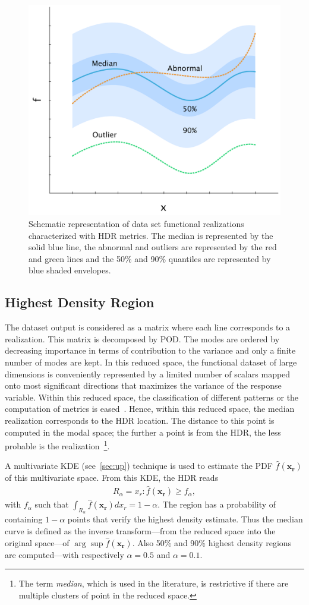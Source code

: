 \begin{figure}[!ht]
\centering
\includegraphics[width=0.6\linewidth,keepaspectratio]{fig/literature/pattern_hdr.pdf}
\caption{Schematic representation of data set functional realizations characterized with HDR metrics. The median is represented by the solid blue line, the abnormal and outliers are represented by the red and green lines and the 50\% and 90\% quantiles are represented by blue shaded envelopes.}
\label{fig:pattern_hdr}
\end{figure}

\subsection{Highest Density Region}
\label{sec:HDR}

The dataset output is considered as a matrix where each line corresponds to a realization. This matrix is decomposed by POD. The modes are ordered by decreasing importance in terms of contribution to the variance and only a finite number of modes are kept. In this reduced space, the functional dataset of large dimensions is conveniently represented by a limited number of scalars mapped onto most significant directions that maximizes the variance of the response variable. Within this reduced space, the classification of different patterns or the computation of metrics is eased~\citep{Ren2017}. Hence, within this reduced space, the median realization corresponds to the HDR location. The distance to this point is computed in the modal space; the further a point is from the HDR, the less probable is the realization~\footnote{The term \emph{median}, which is used in the literature, is restrictive if there are multiple clusters of point in the reduced space.}.

A multivariate KDE (see~\cref{sec:up}) technique is used to estimate the PDF $\hat{f}(\mathbf{x_r})$ of this multivariate space. From this KDE, the HDR reads
\begin{align}
R_\alpha = {x_r: \hat{f}(\mathbf{x_r}) \geq f_{\alpha}},
\end{align}
\noindent with $f_{\alpha}$ such that $\int_{R_\alpha} \hat{f}(\mathbf{x_r}) d x_r = 1 - \alpha$. The region has a probability of containing $1-\alpha$ points that verify the highest density estimate. Thus the median curve is defined as the inverse transform---from the reduced space into the original space---of $\arg \sup \hat{f}(\mathbf{x_r})$. Also 50\% and 90\% highest density regions are computed---with respectively $\alpha=0.5$ and $\alpha=0.1$.

